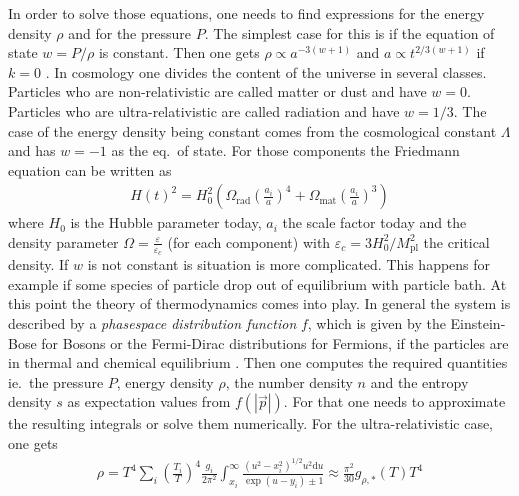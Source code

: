 \documentclass[a4paper, 12pt]{article}
\newcommand{\diff}{\mathrm{d}}
\begin{document}
\noindent
In order to solve those equations, one needs to find expressions
for the energy density $\rho$ and for the pressure $P$.
The simplest case for this is if the equation of state $w = P / \rho$ is constant.
Then one gets $\rho \propto a^{-3(w + 1)}$ \cite[Eq. 3.36]{TheEarlyUniverseKolbAndTurner} and $a \propto t^{2/3(w + 1)}$ if $k = 0$ \cite[Eq. 3.37]{TheEarlyUniverseKolbAndTurner}.
In cosmology one divides the content of the universe in several classes.
Particles who are non-relativistic are called matter or dust and have $w = 0$.
Particles who are ultra-relativistic are called radiation and have $w = 1/3$.
The case of the energy density being constant comes from the cosmological constant $\Lambda$ and has $w = -1$ as
the eq.\ of state. \cite[Eq. 3.7]{TheEarlyUniverseKolbAndTurner}
For those components the Friedmann equation can be written as
\cite[Eq. 9]{FriedmannPaper}
\begin{align}
    \label{eq:hubble_parameter_evo}
    H(t)^2 = H_0^2 \left(
        \Omega_\mathrm{rad} \left( \frac{a_i}{a} \right)^4 +
        \Omega_\mathrm{mat} \left( \frac{a_i}{a} \right)^3
    \right)
\end{align}
where $H_0$ is the Hubble parameter today, $a_i$ the scale factor today and the density parameter $\Omega = \frac{\varepsilon}{\varepsilon_c}$ (for each component) with $\varepsilon_c = 3 H_0^2 / M_\mathrm{pl}^2$ the critical density.
If $w$ is not constant is situation is more complicated. This happens for example if
some species of particle drop out of equilibrium with particle bath.
At this point the theory of thermodynamics comes into play. In general the system is described by a \emph{phasespace distribution function}  $f$, which is given by the
Einstein-Bose for Bosons or the Fermi-Dirac distributions for Fermions, if
the particles are in thermal and chemical equilibrium \cite[Sec. 3.3]{TheEarlyUniverseKolbAndTurner}. Then one computes
the required quantities ie.\ the pressure $P$, energy density $\rho$, the number density $n$ and the entropy density $s$ as expectation values
from $f(|\vec{p}|)$. For that one needs to approximate the resulting integrals or solve them numerically. For the ultra-relativistic case, one gets \cite[Eq. 3.51, 3.52, 3.59, 3.61, 3.62] {TheEarlyUniverseKolbAndTurner}
\begin{align}
    \label{eq:energy_denstiy}
    \rho =
   T^4 \sum_i \left( \frac{T_i}{T} \right)^4 \frac{g_i}{2 \pi^2} \int_{x_i}^\infty
   \frac{(u^2 - x_i^2)^{1/2} u^2 \diff u}{\exp(u - y_i) \pm 1} \approx
    \frac{\pi^2}{30} g_{\rho, *}(T) T^4
\end{align}
\end{document}
